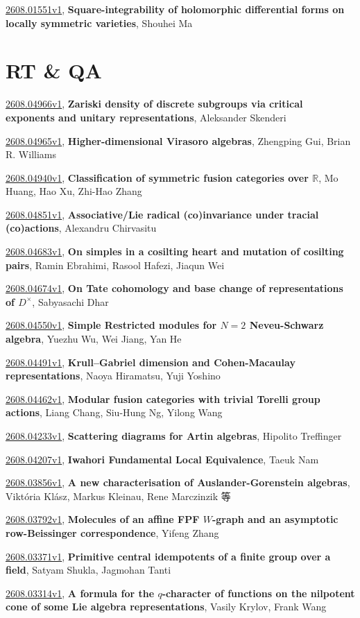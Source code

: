 \documentclass[9pt, a4paper]{article}
\theoremstyle{plain}
\theoremstyle{definition}
\theoremstyle{remark}
\newcommand{\arxiv}[3]{\href{https://arxiv.org/abs/#1}{#1}, \textbf{\textcolor{arxivblue}{#2}}, #3}
\begin{document}
\arxiv{2608.01551v1}{Square-integrability of holomorphic differential forms on locally symmetric varieties}{Shouhei Ma}


\section{RT \& QA}
\arxiv{2608.04966v1}{Zariski density of discrete subgroups via critical exponents and unitary representations}{Aleksander Skenderi}

\arxiv{2608.04965v1}{Higher-dimensional Virasoro algebras}{Zhengping Gui, Brian R. Williams}

\arxiv{2608.04940v1}{Classification of symmetric fusion categories over $\mathbb{R}$}{Mo Huang, Hao Xu, Zhi-Hao Zhang}

\arxiv{2608.04851v1}{Associative/Lie radical (co)invariance under tracial (co)actions}{Alexandru Chirvasitu}

\arxiv{2608.04683v1}{On simples in a cosilting heart and mutation of cosilting pairs}{Ramin Ebrahimi, Rasool Hafezi, Jiaqun Wei}

\arxiv{2608.04674v1}{On Tate cohomology and base change of representations of $D^\times$}{Sabyasachi Dhar}

\arxiv{2608.04550v1}{Simple Restricted modules for $N=2$ Neveu-Schwarz algebra}{Yuezhu Wu, Wei Jiang, Yan He}

\arxiv{2608.04491v1}{Krull--Gabriel dimension and Cohen-Macaulay representations}{Naoya Hiramatsu, Yuji Yoshino}

\arxiv{2608.04462v1}{Modular fusion categories with trivial Torelli group actions}{Liang Chang, Siu-Hung Ng, Yilong Wang}

\arxiv{2608.04233v1}{Scattering diagrams for Artin algebras}{Hipolito Treffinger}

\arxiv{2608.04207v1}{Iwahori Fundamental Local Equivalence}{Taeuk Nam}

\arxiv{2608.03856v1}{A new characterisation of Auslander-Gorenstein algebras}{Viktória Klász, Markus Kleinau, Rene Marczinzik 等}

\arxiv{2608.03792v1}{Molecules of an affine FPF $W$-graph and an asymptotic row-Beissinger correspondence}{Yifeng Zhang}

\arxiv{2608.03371v1}{Primitive central idempotents of a finite group over a field}{Satyam Shukla, Jagmohan Tanti}

\arxiv{2608.03314v1}{A formula for the $q$-character of functions on the nilpotent cone of some Lie algebra representations}{Vasily Krylov, Frank Wang}
\end{document}
